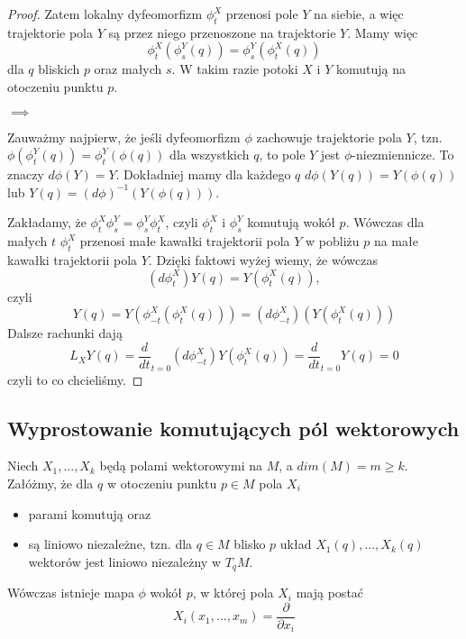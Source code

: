 \begin{proof}
  Zatem lokalny dyfeomorfizm $\phi_t^X$ przenosi pole $Y$ na siebie, a więc trajektorie pola $Y$ są przez niego przenoszone na trajektorie $Y$. Mamy więc
  $$\phi_t^X(\phi_s^Y(q))=\phi_s^Y(\phi_t^X(q))$$
  dla $q$ bliskich $p$ oraz małych $s$. W takim razie potoki $X$ i $Y$ komutują na otoczeniu punktu $p$.

  $\implies$

  Zauważmy najpierw, że jeśli dyfeomorfizm $\phi$ zachowuje trajektorie pola $Y$, tzn. $\phi(\phi_t^Y(q))=\phi_t^Y(\phi(q))$ dla wszystkich $q$, to pole $Y$ jest $\phi$-niezmiennicze. To znaczy $d\phi(Y)=Y$. Dokładniej mamy dla każdego $q$ $d\phi(Y(q))=Y(\phi(q))$ lub $Y(q)=(d\phi)^{-1}(Y(\phi(q)))$.

  Zakładamy, że $\phi_t^X\phi_s^Y=\phi_s^Y\phi_t^X$, czyli $\phi_t^X$ i $\phi_s^Y$ komutują wokół $p$. Wówczas dla małych $t$ $\phi_t^X$ przenosi małe kawałki trajektorii pola $Y$ w pobliżu $p$ na małe kawałki trajektorii pola $Y$. Dzięki faktowi wyżej wiemy, że wówczas
  $$(d\phi_t^X)Y(q)=Y(\phi_t^X(q)),$$
  czyli
  $$Y(q)=Y(\phi_{-t}^X(\phi_t^X(q)))=(d\phi_{-t}^X)(Y(\phi_t^X(q)))$$
  Dalsze rachunki dają
  $$L_XY(q)=\frac{d}{dt}_{t=0}(d\phi_{-t}^X)Y(\phi_t^X(q))=\frac{d}{dt}_{t=0}Y(q)=0$$
  czyli to co chcieliśmy.
\end{proof}

\subsection{Wyprostowanie komutujących pól wektorowych}

\begin{theorem} 
  Niech $X_1,...,X_k$ będą polami wektorowymi na $M$, a $dim(M)=m\geq k$. Załóżmy, że dla $q$ w otoczeniu punktu $p\in M$ pola $X_i$ 
  \begin{itemize}
    \item parami komutują oraz 
    \item są liniowo niezależne, tzn. dla $q\in M$ blisko $p$ układ $X_1(q),...,X_k(q)$ wektorów jest liniowo niezależny w $T_qM$.
  \end{itemize}

  Wówczas istnieje mapa $\phi$ wokół $p$, w której pola $X_i$ mają postać
  $$X_i(x_1,...,x_m)=\frac{\partial}{\partial x_i}$$
\end{theorem}


